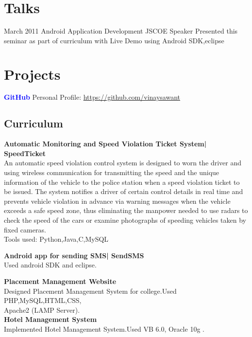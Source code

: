 \documentclass[11pt,a4paper]{moderncv}
\begin{document}

\vspace{.2in}\section{Talks }
\cventry
{March 2011}
{Android Application Development}
{JSCOE}
{Speaker}
{}
{Presented this seminar as part of curriculum with Live Demo using Android SDK,eclipse}


\vspace{.2in}\section{Projects}
\cventry
{\textbf{\textcolor{blue}{GitHub}}}
{Personal Profile: \url{https://github.com/vinaysawant}}
{}{}{}{}
\vspace{.1in}\subsection{Curriculum}
\cvlistitem
{\textbf{Automatic Monitoring and Speed Violation Ticket System| SpeedTicket}  
  \\An automatic speed violation control system is designed to worn the driver and using wireless communication for transmitting the speed and the unique information of the vehicle to the police station when a speed violation ticket to be issued. The system notifies a driver of certain control details in real time and prevents vehicle violation in advance via warning messages when the vehicle exceeds a safe speed zone, thus eliminating the manpower needed to use radars to check the speed of the cars or examine photographs of speeding vehicles taken by fixed cameras.
\\
Tools used: Python,Java,C,MySQL
}

\cvlistitem
{
  \textbf{Android app for sending SMS| SendSMS}
  \\Used android SDK and eclipse.
  \\
}

\cvlistitem
{
  \textbf{Placement Management Website }
  \\Designed Placement Management System for college.Used PHP,MySQL,HTML,CSS,
  \\Apache2 (LAMP Server).
  \\
}
\cvlistitem
{
  \textbf{Hotel Management System }
  \\Implemented Hotel Management System.Used VB 6.0, Oracle 10g .
}
\end{document}
